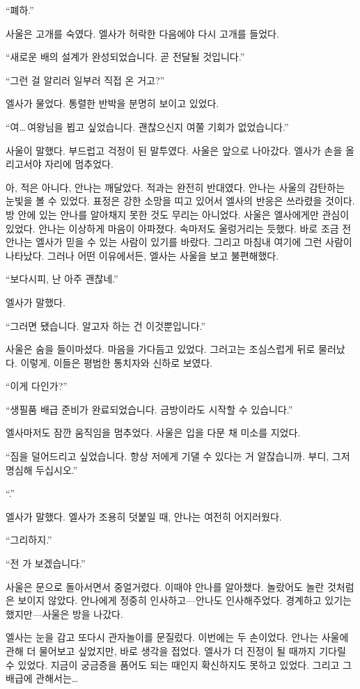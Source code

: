 ``폐하.''

사울은 고개를 숙였다. 엘사가 허락한 다음에야 다시 고개를 들었다.

``새로운 배의 설계가 완성되었습니다. 곧 전달될 것입니다.''

``그런 걸 알리러 일부러 직접 온 거고?''

엘사가 물었다. 통렬한 반박을 분명히 보이고 있었다.

``여\ldots\,여왕님을 뵙고 싶었습니다. 괜찮으신지 여쭐 기회가 없었습니다.''

사울이 말했다. 부드럽고 걱정이 된 말투였다. 사울은 앞으로 나아갔다. 엘사가 손을 올리고서야 자리에 멈추었다.

아, 적은 아니다, 안나는 깨달았다. 적과는 완전히 반대였다. 안나는 사울의 감탄하는 눈빛을 볼 수 있었다. 표정은 강한 소망을 띠고 있어서 엘사의 반응은 쓰라렸을 것이다. 방 안에 있는 안나를 알아채지 못한 것도 무리는 아니었다. 사울은 엘사에게만 관심이 있었다. 안나는 이상하게 마음이 아파졌다. 속마저도 울렁거리는 듯했다. 바로 조금 전 안나는 엘사가 믿을 수 있는 사람이 있기를 바랐다. 그리고 마침내 여기에 그런 사람이 나타났다. 그러나 어떤 이유에서든, 엘사는 사울을 보고 불편해했다.

``보다시피, 난 아주 괜찮네.''

엘사가 말했다.

``그러면 됐습니다. 알고자 하는 건 이것뿐입니다.''

사울은 숨을 들이마셨다. 마음을 가다듬고 있었다. 그러고는 조심스럽게 뒤로 물러났다. 이렇게, 이들은 평범한 통치자와 신하로 보였다.

``이게 다인가?''

``생필품 배급 준비가 완료되었습니다. 금방이라도 시작할 수 있습니다.''

엘사마저도 잠깐 움직임을 멈추었다. 사울은 입을 다문 채 미소를 지었다.

``짐을 덜어드리고 싶었습니다. 항상 저에게 기댈 수 있다는 거 알잖습니까. 부디, 그저 명심해 두십시오.''

``.''

엘사가 말했다. 엘사가 조용히 덧붙일 때, 안나는 여전히 어지러웠다.

``그리하지.''

``전 가 보겠습니다.''

사울은 문으로 돌아서면서 중얼거렸다. 이때야 안나를 알아챘다. 놀랐어도 놀란 것처럼은 보이지 않았다. 안나에게 정중히 인사하고—안나도 인사해주었다. 경계하고 있기는 했지만—사울은 방을 나갔다.

엘사는 눈을 감고 또다시 관자놀이를 문질렀다. 이번에는 두 손이었다. 안나는 사울에 관해 더 물어보고 싶었지만, 바로 생각을 접었다. 엘사가 더 진정이 될 때까지 기다릴 수 있었다. 지금이 궁금증을 품어도 되는 때인지 확신하지도 못하고 있었다. 그리고 그 배급에 관해서는\ldots

